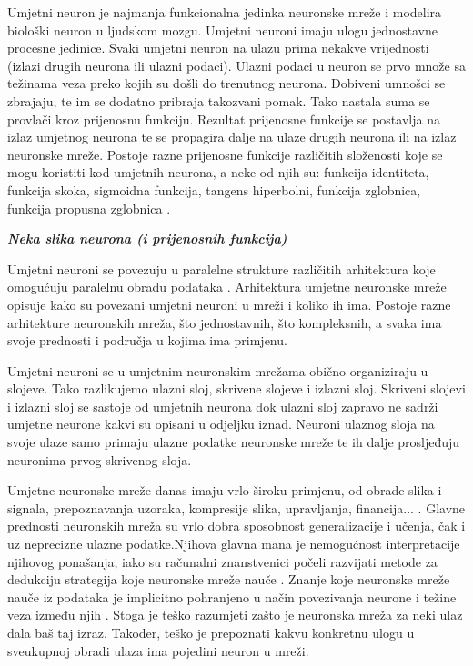 \documentclass[zavrsnirad]{fer}
\begin{document}
	Umjetni neuron je najmanja funkcionalna jedinka neuronske mreže i modelira biološki neuron u ljudskom mozgu. Umjetni neuroni imaju ulogu jednostavne procesne jedinice. Svaki umjetni neuron na ulazu prima nekakve vrijednosti (izlazi drugih neurona ili ulazni podaci). Ulazni podaci u neuron se prvo množe sa težinama veza preko kojih su došli do trenutnog neurona. Dobiveni umnošci se zbrajaju, te im se dodatno pribraja takozvani pomak. Tako nastala suma se provlači kroz prijenosnu funkciju. Rezultat prijenosne funkcije se postavlja na izlaz umjetnog neurona te se propagira dalje na ulaze drugih neurona ili na izlaz neuronske mreže. Postoje razne prijenosne funkcije različitih složenosti koje se mogu koristiti kod umjetnih neurona, a neke od njih su: funkcija identiteta, funkcija skoka, sigmoidna funkcija, tangens hiperbolni, funkcija zglobnica, funkcija propusna zglobnica \cite{skriptaNeuronskeMreze}.

	\textit{\textbf{Neka slika neurona (i prijenosnih funkcija)}}
	
	Umjetni neuroni se povezuju u paralelne strukture različitih arhitektura koje omogućuju paralelnu obradu podataka \cite{skriptaNeuronskeMreze}. Arhitektura umjetne neuronske mreže opisuje kako su povezani umjetni neuroni u mreži i koliko ih ima. Postoje razne arhitekture neuronskih mreža, što jednostavnih, što kompleksnih, a svaka ima svoje prednosti i područja u kojima ima primjenu.
	
	Umjetni neuroni se u umjetnim neuronskim mrežama obično organiziraju u slojeve. Tako razlikujemo ulazni sloj, skrivene slojeve i izlazni sloj. Skriveni slojevi i izlazni sloj se sastoje od umjetnih neurona dok ulazni sloj zapravo ne sadrži umjetne neurone kakvi su opisani u odjeljku iznad. Neuroni ulaznog sloja na svoje ulaze samo primaju ulazne podatke neuronske mreže te ih dalje prosljeđuju neuronima prvog skrivenog sloja.
	
	Umjetne neuronske mreže danas imaju vrlo široku primjenu, od obrade slika i signala, prepoznavanja uzoraka, kompresije slika, upravljanja, financija... \cite{skriptaNeuronskeMreze}. Glavne prednosti neuronskih mreža su vrlo dobra sposobnost generalizacije i učenja, čak i uz neprecizne ulazne podatke.Njihova glavna mana je nemogućnost interpretacije njihovog ponašanja, iako su računalni znanstvenici počeli razvijati metode za dedukciju strategija koje neuronske mreže nauče \cite{MITNeuralNet}. Znanje koje neuronske mreže nauče iz podataka je implicitno pohranjeno u način povezivanja neurone i težine veza između njih \cite{skriptaNeuronskeMreze}. Stoga je teško razumjeti zašto je neuronska mreža za neki ulaz dala baš taj izraz. Također, teško je prepoznati kakvu konkretnu ulogu u sveukupnoj obradi ulaza ima pojedini neuron u mreži.
	
\end{document}
